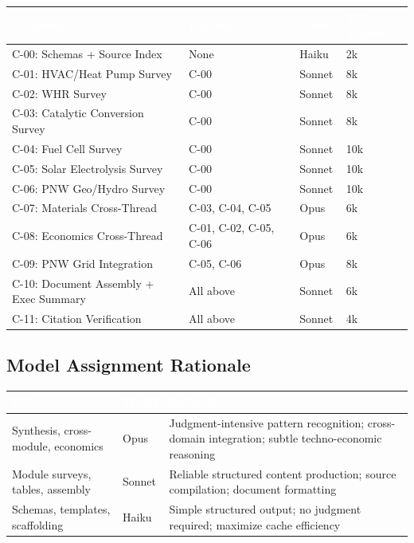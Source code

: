 \documentclass[11pt,letterpaper]{article}
\newcommand{\tableheader}[1]{\textbf{\sffamily\textcolor{white}{#1}}}
\begin{document}
\begin{center}
\begin{tabularx}{\textwidth}{L{3.5cm}L{3cm}C{2cm}C{2cm}}
\toprule
{}
\tableheader{Component} & \tableheader{Dependencies} & \tableheader{Model} & \tableheader{Est. Tokens} \\
\midrule
C-00: Schemas + Source Index & None & Haiku & 2k \\
C-01: HVAC/Heat Pump Survey & C-00 & Sonnet & 8k \\
C-02: WHR Survey & C-00 & Sonnet & 8k \\
C-03: Catalytic Conversion Survey & C-00 & Sonnet & 8k \\
C-04: Fuel Cell Survey & C-00 & Sonnet & 10k \\
C-05: Solar Electrolysis Survey & C-00 & Sonnet & 10k \\
C-06: PNW Geo/Hydro Survey & C-00 & Sonnet & 10k \\
C-07: Materials Cross-Thread & C-03, C-04, C-05 & Opus & 6k \\
C-08: Economics Cross-Thread & C-01, C-02, C-05, C-06 & Opus & 6k \\
C-09: PNW Grid Integration & C-05, C-06 & Opus & 8k \\
C-10: Document Assembly + Exec Summary & All above & Sonnet & 6k \\
C-11: Citation Verification & All above & Sonnet & 4k \\
\bottomrule
\end{tabularx}
\end{center}

\subsection{Model Assignment Rationale}

\begin{center}
\begin{tabularx}{\textwidth}{L{2.5cm}C{1.5cm}X}
\toprule
{}
\tableheader{Role} & \tableheader{Model} & \tableheader{Rationale} \\
\midrule
Synthesis, cross-module, economics & Opus & Judgment-intensive pattern recognition; cross-domain integration; subtle techno-economic reasoning \\
Module surveys, tables, assembly & Sonnet & Reliable structured content production; source compilation; document formatting \\
Schemas, templates, scaffolding & Haiku & Simple structured output; no judgment required; maximize cache efficiency \\
\bottomrule
\end{tabularx}
\end{center}
\end{document}
